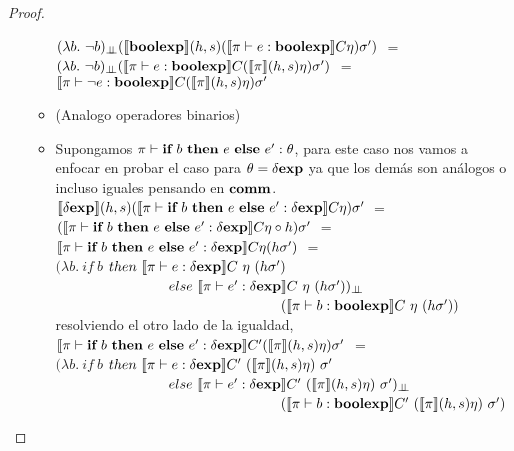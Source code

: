 \begin{proof}
\begin{itemize}
\begin{itemize}
$(\lambda b. \ \neg b)_{\bot \!\!\! \bot}
	(\llbracket \textbf{boolexp} \rrbracket(h,s)(\llbracket \pi \vdash e :\textbf{boolexp} \rrbracket C\eta)\sigma')$ $=$\\
$(\lambda b. \ \neg b)_{\bot \!\!\! \bot}
	(\llbracket \pi \vdash e : \textbf{boolexp} \rrbracket C(\llbracket \pi \rrbracket(h,s)\eta)\sigma')$ $=$\\
$\llbracket \pi \vdash \neg e : \textbf{boolexp} \rrbracket C(\llbracket \pi \rrbracket(h,s)\eta)\sigma'$

\item (Analogo operadores binarios)

\item Supongamos $\pi \vdash \textbf{if} \ b \ \textbf{then} \ e \ \textbf{else} \ e' : \theta$, para este caso
nos vamos a enfocar en probar el caso para $\theta = \delta \textbf{exp}$ ya que los dem\'as
son an\'alogos o incluso iguales pensando en $\textbf{comm}$.\\

$\llbracket \delta \textbf{exp} \rrbracket(h,s)
	(\llbracket \pi \vdash \textbf{if} \ b \ \textbf{then} \ e \ \textbf{else} \ e' : \delta \textbf{exp} \rrbracket C\eta)\sigma'$ $=$\\
$(\llbracket \pi \vdash \textbf{if} \ b \ \textbf{then} \ e \ \textbf{else} \ e' : \delta \textbf{exp} \rrbracket C\eta \circ h)\sigma'$ $=$\\
$\llbracket \pi \vdash \textbf{if} \ b \ \textbf{then} \ e \ \textbf{else} \ e' : \delta \textbf{exp} \rrbracket C\eta (h\sigma')$ $=$\\
$(\lambda b . \ if \ b $ $then \ \llbracket  \pi \vdash e : \delta \textbf{exp} \rrbracket C \ \eta \ (h\sigma')$\\
\indent \ \ \ \ \ \ \ \ \ \ \ \ \ \ \ \ 
$else \ \llbracket  \pi \vdash e' : \delta \textbf{exp} \rrbracket C \ \eta \ (h\sigma'))_{\bot \!\!\! \bot}$ \\
\indent \ \ \ \ \ \ \ \ \ \ \ \ \ \ \ \ \ \ \ \ \ \ \ \ \ \ \ \ \ \ \ \
$(\llbracket  \pi \vdash b : \textbf{boolexp} \rrbracket C \ \eta \ (h\sigma'))$\\

resolviendo el otro lado de la igualdad,\\

$\llbracket \pi \vdash \textbf{if} \ b \ \textbf{then} \ e \ \textbf{else} \ e' : \delta \textbf{exp} \rrbracket C'
							(\llbracket \pi \rrbracket(h,s)\eta)\sigma'$ $=$\\
$(\lambda b . \ if \ b $ $then \ \semBrcks{ \pi \vdash e : \deltaexp}C' \ 
						(\semBrcks{\pi}(h,s)\eta) \ \sigma'$\\
\indent \ \ \ \ \ \ \ \ \ \ \ \ \ \ \ \ 
$else \ \semBrcks{ \pi \vdash e' : \deltaexp}C' \ 
						(\semBrcks{\pi}(h,s)\eta) \ \sigma')_{\dbot}$ \\
\indent \ \ \ \ \ \ \ \ \ \ \ \ \ \ \ \ \ \ \ \ \ \ \ \ \ \ \ \ \ \ \ \
$(\semBrcks{ \pi \vdash b : \boolexp}C' \ (\semBrcks{\pi}(h,s)\eta) \ \sigma')$\\


\end{itemize}
\end{itemize}
\end{proof}
